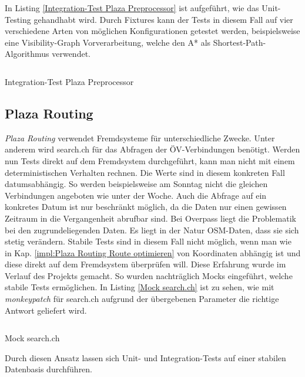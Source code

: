 In Listing \ref{Integration-Test Plaza Preprocessor} ist aufgeführt, wie das Unit-Testing gehandhabt wird. Durch Fixtures kann der Tests in diesem Fall auf vier verschiedene Arten von möglichen Konfigurationen getestet werden, beispielsweise eine Visibility-Graph Vorverarbeitung, welche den A* \cite{astar} als Shortest-Path-Algorithmus verwendet.

\begin{listing}[ht]
    \inputminted{python}{projectdoc/listing/test_plaza_prepreprocessor.py}
    \caption{Integration-Test Plaza Preprocessor}
    \label{Integration-Test Plaza Preprocessor}
\end{listing}

\subsection{Plaza Routing}
\label{test:Plaza Routing}

\emph{Plaza Routing} verwendet Fremdsysteme für unterschiedliche Zwecke. Unter anderem wird search.ch \cite{search_ch_route_api} für das Abfragen der ÖV-Verbindungen benötigt. Werden nun Tests direkt auf dem Fremdsystem durchgeführt, kann man nicht mit einem deterministischen Verhalten rechnen. Die Werte sind in diesem konkreten Fall datumsabhängig. So werden beispielsweise am Sonntag nicht die gleichen Verbindungen angeboten wie unter der Woche. Auch die Abfrage auf ein konkretes Datum ist nur beschränkt möglich, da die Daten nur einen gewissen Zeitraum in die Vergangenheit abrufbar sind. Bei Overpass \cite{wiki:overpass} liegt die Problematik bei den zugrundeliegenden Daten. Es liegt in der Natur \ac{OSM}-Daten, dass sie sich stetig verändern. Stabile Tests sind in diesem Fall nicht möglich, wenn man wie in Kap. \ref{impl:Plaza Routing Route optimieren} von Koordinaten abhängig ist und diese direkt auf dem Fremdsystem überprüfen will. Diese Erfahrung wurde im Verlauf des Projekts gemacht. So wurden nachträglich Mocks eingeführt, welche stabile Tests ermöglichen. In Listing \ref{Mock search.ch} ist zu sehen, wie mit \emph{monkeypatch} \cite{pytest} für search.ch \cite{search_ch_route_api} aufgrund der übergebenen Parameter die richtige Antwort geliefert wird. 

\begin{listing}[ht]
    \inputminted{python}{projectdoc/listing/mock_search_ch.py}
    \caption{Mock search.ch}
    \label{Mock search.ch}
\end{listing}

Durch diesen Ansatz lassen sich Unit- und Integration-Tests auf einer stabilen Datenbasis durchführen.

